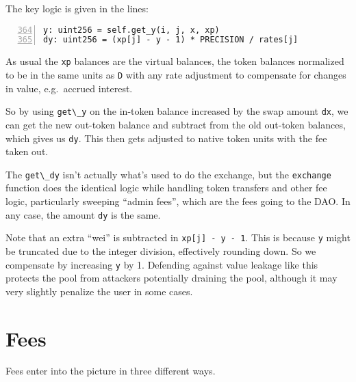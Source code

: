 \documentclass[
]{article}
\newcommand{\passthrough}[1]{#1}
\begin{document}
The key logic is given in the lines:

\begin{lstlisting}[numbers=left, firstnumber=364]
y: uint256 = self.get_y(i, j, x, xp)
dy: uint256 = (xp[j] - y - 1) * PRECISION / rates[j]
\end{lstlisting}

As usual the \passthrough{\lstinline!xp!} balances are the virtual
balances, the token balances normalized to be in the same units as
\passthrough{\lstinline!D!} with any rate adjustment to compensate for
changes in value, e.g.~accrued interest.

So by using \passthrough{\lstinline!get\_y!} on the in-token balance
increased by the swap amount \passthrough{\lstinline!dx!}, we can get
the new out-token balance and subtract from the old out-token balances,
which gives us \passthrough{\lstinline!dy!}. This then gets adjusted to
native token units with the fee taken out.

The \passthrough{\lstinline!get\_dy!} isn't actually what's used to do
the exchange, but the \passthrough{\lstinline!exchange!} function does
the identical logic while handling token transfers and other fee logic,
particularly sweeping ``admin fees'', which are the fees going to the
DAO. In any case, the amount \passthrough{\lstinline!dy!} is the same.

Note that an extra ``wei'' is subtracted in
\passthrough{\lstinline!xp[j] - y - 1!}. This is because
\passthrough{\lstinline!y!} might be truncated due to the integer
division, effectively rounding down. So we compensate by increasing
\passthrough{\lstinline!y!} by 1. Defending against value leakage like
this protects the pool from attackers potentially draining the pool,
although it may very slightly penalize the user in some cases.

\hypertarget{fees}{%
\section{Fees}\label{fees}}

Fees enter into the picture in three different ways.
\end{document}

